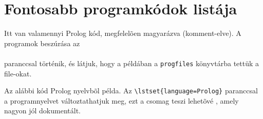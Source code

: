 \chapter{Fontosabb programkódok listája}\label{ch:progik}


Itt van valamennyi Prolog kód, megfelelõen magyarázva (komment-elve). A programok beszúrása az\\
\verb++\\
paranccsal történik, és látjuk, hogy a példában a \verb+progfiles+ könyvtárba tettük a file-okat.

Az alábbi kód Prolog nyelvbõl példa. Az \verb+\lstset{language=Prolog}+ paranccsal a programnyelvet változtathatjuk meg, ezt a  csomag teszi lehetõvé \cite{listingCite}, amely nagyon jól dokumentált.


%

